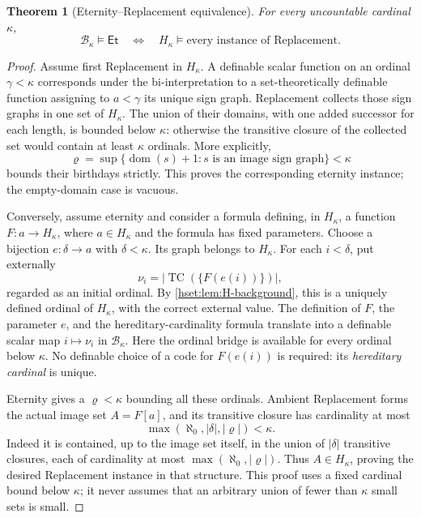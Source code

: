 \documentclass[11pt,letterpaper]{article}
\newtheorem{theorem}{Theorem}[section]
\theoremstyle{definition}
\theoremstyle{remark}
\newcommand{\TC}{\operatorname{TC}}
\newcommand{\B}{\mathcal B}
\newcommand{\Et}{\mathsf{Et}}
\newcommand{\card}[1]{\lvert#1\rvert}
\newcommand{\dom}{\operatorname{dom}}
\begin{document}
\begin{theorem}[Eternity--Replacement equivalence]
\label{hset:thm:eternity-replacement}
For every uncountable cardinal $\kappa$,
\[
 \B_\kappa\models\Et
 \quad\Longleftrightarrow\quad
 H_\kappa\models\text{every instance of Replacement}.
\]
\end{theorem}
\begin{proof}
Assume first Replacement in $H_\kappa$. A definable scalar function on an
ordinal $\gamma<\kappa$ corresponds under the bi-interpretation to a
set-theoretically definable function assigning to $a<\gamma$ its unique
sign graph. Replacement collects those sign graphs in one set of
$H_\kappa$. The union of their domains, with one added successor for each
length, is bounded below $\kappa$: otherwise the transitive closure of the
collected set would contain at least $\kappa$ ordinals. More explicitly,
\[
 \varrho=\sup\{\dom(s)+1:s\text{ is an image sign graph}\}<\kappa
\]
bounds their birthdays strictly. This proves the corresponding eternity
instance; the empty-domain case is vacuous.

Conversely, assume eternity and consider a formula defining, in
$H_\kappa$, a function $F:a\to H_\kappa$, where $a\in H_\kappa$ and the
formula has fixed parameters. Choose a bijection $e:\delta\to a$ with
$\delta<\kappa$. Its graph belongs to $H_\kappa$. For each $i<\delta$, put
externally
\[
 \nu_i=\card{\TC(\{F(e(i))\})},
\]
regarded as an initial ordinal. By \cref{hset:lem:H-background}, this is a
uniquely defined ordinal of $H_\kappa$, with the correct external value.
The definition of $F$, the parameter $e$, and the hereditary-cardinality
formula translate into a definable scalar map $i\mapsto\nu_i$ in
$\B_\kappa$. Here the ordinal bridge is available for every ordinal below
$\kappa$. No definable choice of a code for $F(e(i))$ is required: its
\emph{hereditary cardinal} is unique.

Eternity gives a $\varrho<\kappa$ bounding all these ordinals. Ambient
Replacement forms the actual image set $A=F[a]$, and its transitive closure
has cardinality at most
\[
 \max(\aleph_0,\card\delta,\card\varrho)<\kappa.
\]
Indeed it is contained, up to the image set itself, in the union of
$\card\delta$ transitive closures, each of cardinality at most
$\max(\aleph_0,\card\varrho)$. Thus $A\in H_\kappa$, proving the desired
Replacement instance in that structure. This proof uses a fixed cardinal
bound below $\kappa$; it never assumes that an arbitrary union of fewer than
$\kappa$ small sets is small.
\end{proof}
\end{document}
